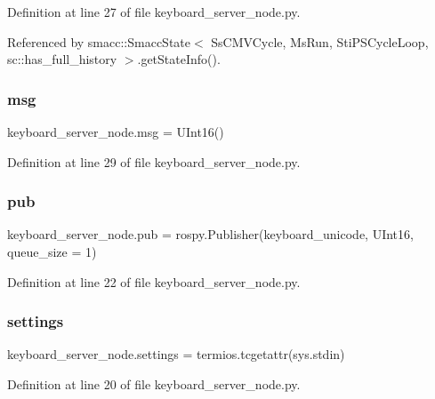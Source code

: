 Definition at line 27 of file keyboard\+\_\+server\+\_\+node.\+py.



Referenced by smacc\+::\+Smacc\+State$<$ Ss\+C\+M\+V\+Cycle, Ms\+Run, Sti\+P\+S\+Cycle\+Loop, sc\+::has\+\_\+full\+\_\+history $>$.\+get\+State\+Info().

\mbox{\label{namespacekeyboard__server__node_a555024e72f3e57503b0eebad2546fc72}} 
\subsubsection{\texorpdfstring{msg}{msg}}
{\footnotesize\ttfamily keyboard\+\_\+server\+\_\+node.\+msg = U\+Int16()}



Definition at line 29 of file keyboard\+\_\+server\+\_\+node.\+py.

\mbox{\label{namespacekeyboard__server__node_acb9a153a1e2ddb5dab254f49ade8512e}} 
\subsubsection{\texorpdfstring{pub}{pub}}
{\footnotesize\ttfamily keyboard\+\_\+server\+\_\+node.\+pub = rospy.\+Publisher(\textquotesingle{}keyboard\+\_\+unicode\textquotesingle{}, U\+Int16, queue\+\_\+size = 1)}



Definition at line 22 of file keyboard\+\_\+server\+\_\+node.\+py.

\mbox{\label{namespacekeyboard__server__node_ade1a45e58d917f8cdb07d1d54ac6bd34}} 
\subsubsection{\texorpdfstring{settings}{settings}}
{\footnotesize\ttfamily keyboard\+\_\+server\+\_\+node.\+settings = termios.\+tcgetattr(sys.\+stdin)}



Definition at line 20 of file keyboard\+\_\+server\+\_\+node.\+py.

